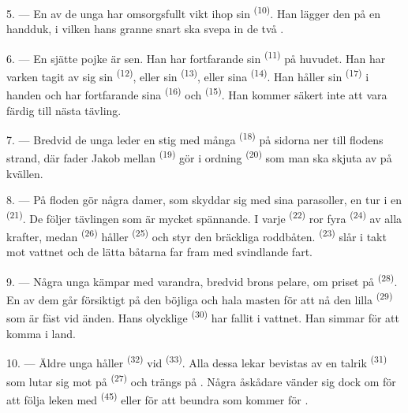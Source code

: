 5. --- En av de unga har omsorgsfullt vikt ihop sin  \textsuperscript{(10)}. Han
lägger den på en handduk, i vilken hans granne snart ska svepa in de två .

6. --- En sjätte pojke är sen. Han har fortfarande sin  \textsuperscript{(11)}
på huvudet. Han har varken tagit av sig sin
 \textsuperscript{(12)}, eller sin 
\textsuperscript{(13)}, eller sina  \textsuperscript{(14)}. Han håller sin
 \textsuperscript{(17)} i handen och har fortfarande sina 
\textsuperscript{(16)} och  \textsuperscript{(15)}. Han kommer säkert inte
att vara färdig till nästa tävling.

7. --- Bredvid de unga leder en stig med många  \textsuperscript{(18)} på
sidorna ner till flodens strand, där fader Jakob mellan
 \textsuperscript{(19)} gör i ordning 
\textsuperscript{(20)} som man ska skjuta av på kvällen.

\VUsaut{4.4mm}
\VUsaut{3.4mm}

8. --- På floden gör några damer, som skyddar sig med sina parasoller, en tur i en
 \textsuperscript{(21)}. De följer tävlingen som är mycket spännande. I varje
 \textsuperscript{(22)} ror fyra
 \textsuperscript{(24)} av alla krafter, medan 
\textsuperscript{(26)} håller  \textsuperscript{(25)} och styr den bräckliga
roddbåten.  \textsuperscript{(23)} slår i takt mot vattnet och de lätta båtarna
far fram med svindlande fart.

9. --- Några unga kämpar med varandra, bredvid brons pelare, om priset på
 \textsuperscript{(28)}. En av dem går försiktigt på
den böjliga och hala masten för att nå den lilla  \textsuperscript{(29)} som
är fäst vid änden. Hans olycklige  \textsuperscript{(30)} har fallit i
vattnet. Han simmar för att komma i land.

10. --- Äldre unga håller  \textsuperscript{(32)} vid
 \textsuperscript{(33)}. Alla dessa lekar bevistas av en talrik
 \textsuperscript{(31)} som lutar sig mot  på
 \textsuperscript{(27)} och trängs på . Några
åskådare vänder sig dock om för att följa leken med  \textsuperscript{(45)}
eller för att beundra  som kommer för .

